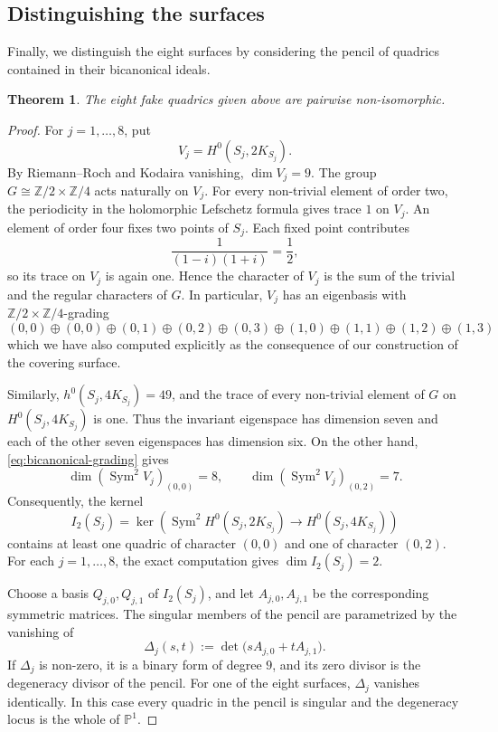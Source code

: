 \documentclass[11pt,a4paper]{article}
\newtheorem{theorem}{Theorem}[section]
\begin{document}
\subsection{Distinguishing the surfaces}
\label{subsec:distinguishing-surfaces}

Finally, we distinguish the eight surfaces by considering the pencil of quadrics contained in their bicanonical ideals.

\begin{theorem}
The eight fake quadrics given above are pairwise non-isomorphic.
\end{theorem}

\begin{proof}
For \(j=1,\ldots,8\), put
\[
        V_j=H^0(S_j,2K_{S_j}).
\]
By Riemann--Roch and Kodaira vanishing, \(\dim V_j=9\). The group
\(G\cong\mathbb Z/2\times\mathbb Z/4\) acts naturally on \(V_j\). For
every non-trivial element of order two, the periodicity in the
holomorphic Lefschetz formula gives trace $1$ on \(V_j\). An element of
order four fixes two points of \(S_j\). Each fixed point contributes
\[
        \frac{1}{(1-i)(1+i)}=\frac12,
\]
so its trace on \(V_j\) is again one. Hence the character of \(V_j\) is
the sum of the trivial and the regular characters of \(G\). In particular,
\(V_j\) has an eigenbasis with
\(\mathbb Z/2\times\mathbb Z/4\)-grading
\begin{equation}
 (0,0)\oplus(0,0)\oplus(0,1)\oplus(0,2)\oplus(0,3)
 \oplus(1,0)\oplus(1,1)\oplus(1,2)\oplus(1,3)
 \label{eq:bicanonical-grading}
\end{equation}
which we have also computed explicitly as the consequence of our construction of the covering surface.

Similarly, \(h^0(S_j,4K_{S_j})=49\), and the trace of every non-trivial
element of \(G\) on \(H^0(S_j,4K_{S_j})\) is one. Thus the invariant
eigenspace has dimension seven and each of the other seven eigenspaces
has dimension six. On the other hand,
\eqref{eq:bicanonical-grading} gives
\[
 \dim\!\left(\operatorname{Sym}^2V_j\right)_{(0,0)}=8,
 \qquad
 \dim\!\left(\operatorname{Sym}^2V_j\right)_{(0,2)}=7.
\]
Consequently, the kernel
\[
 I_2(S_j)=\ker\!\left(
   \operatorname{Sym}^2H^0(S_j,2K_{S_j})
   \longrightarrow H^0(S_j,4K_{S_j})
 \right)
\]
contains at least one quadric of character \((0,0)\) and one of
character \((0,2)\). For each \(j=1,\ldots,8\), the exact computation
gives
\(
        \dim I_2(S_j)=2.
\)

Choose a basis \(Q_{j,0},Q_{j,1}\) of \(I_2(S_j)\), and let
\(A_{j,0},A_{j,1}\) be the corresponding symmetric matrices. The
singular members of the pencil are parametrized by the vanishing of
\[
        \Delta_j(s,t)
        :=\det\bigl(sA_{j,0}+tA_{j,1}\bigr).
\]
If \(\Delta_j\) is non-zero, it is a binary form of degree \(9\), and
its zero divisor is the degeneracy divisor of the pencil. For one of
the eight surfaces, \(\Delta_j\) vanishes identically. In this case
every quadric in the pencil is singular and the degeneracy locus is the
whole of \(\mathbb P^1\).


\end{proof}
\end{document}
